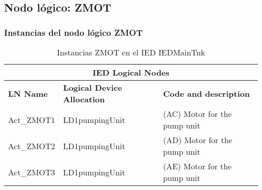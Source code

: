 
\subsection{Nodo l\'ogico: 			 ZMOT}

    \subsubsection{Instancias del nodo l\'ogico ZMOT}
    \begin{table}[H]
    \begin{center}
    \begin{tabular}{|l|l|p{6.8cm}|}
            \hline
            \multicolumn{3}{|c|}{\cellcolor[gray]{0.8} \textbf{IED Logical Nodes} } \\
            \hline
            \textbf{LN Name} & \textbf{Logical Device Allocation} & \textbf{Code and description} \\
            \hline
            Act\_ZMOT1 & LD1pumpingUnit & (AC) Motor for the pump unit \\
            \hline
            Act\_ZMOT2 & LD1pumpingUnit & (AD) Motor for the pump unit \\
            \hline
            Act\_ZMOT3 & LD1pumpingUnit & (AE) Motor for the pump unit \\
            \hline
    \end{tabular}
    \caption{Instancias ZMOT en el IED IEDMainTnk}
    \label{table:lnInstZMOTa}
    \end{center}
    \end{table}
    
    
    
